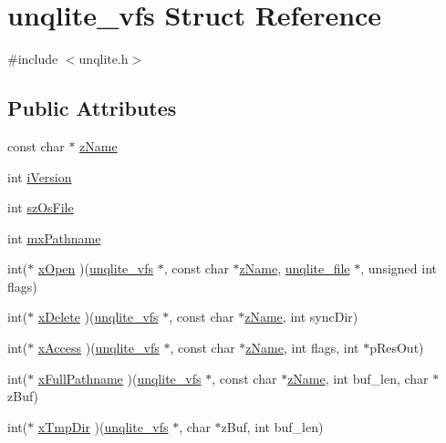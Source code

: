 \hypertarget{structunqlite__vfs}{\section{unqlite\-\_\-vfs Struct Reference}
\label{d5/d07/structunqlite__vfs}
}


{\ttfamily \#include $<$unqlite.\-h$>$}

\subsection*{Public Attributes}
\begin{DoxyCompactItemize}
\item 
const char $\ast$ \hyperlink{structunqlite__vfs_a6408d31a9666612a52fd8248fcc09c15}{z\-Name}
\item 
int \hyperlink{structunqlite__vfs_afd249993dc763d713902629c67118a1a}{i\-Version}
\item 
int \hyperlink{structunqlite__vfs_a7a0d077540d8ea96372383b4b288dca2}{sz\-Os\-File}
\item 
int \hyperlink{structunqlite__vfs_a06f5a5213f2a885826351ba8a8e653b8}{mx\-Pathname}
\item 
int($\ast$ \hyperlink{structunqlite__vfs_a89535ece5182f32a6281d5895cce61a9}{x\-Open} )(\hyperlink{structunqlite__vfs}{unqlite\-\_\-vfs} $\ast$, const char $\ast$\hyperlink{structunqlite__vfs_a6408d31a9666612a52fd8248fcc09c15}{z\-Name}, \hyperlink{structunqlite__file}{unqlite\-\_\-file} $\ast$, unsigned int flags)
\item 
int($\ast$ \hyperlink{structunqlite__vfs_ad961a2b6210572b31877922d4b18eb99}{x\-Delete} )(\hyperlink{structunqlite__vfs}{unqlite\-\_\-vfs} $\ast$, const char $\ast$\hyperlink{structunqlite__vfs_a6408d31a9666612a52fd8248fcc09c15}{z\-Name}, int sync\-Dir)
\item 
int($\ast$ \hyperlink{structunqlite__vfs_a3d8d2a74a38438995cbf4591aa18cad7}{x\-Access} )(\hyperlink{structunqlite__vfs}{unqlite\-\_\-vfs} $\ast$, const char $\ast$\hyperlink{structunqlite__vfs_a6408d31a9666612a52fd8248fcc09c15}{z\-Name}, int flags, int $\ast$p\-Res\-Out)
\item 
int($\ast$ \hyperlink{structunqlite__vfs_ad18e48a2b14c153ff1e06a3194c963b7}{x\-Full\-Pathname} )(\hyperlink{structunqlite__vfs}{unqlite\-\_\-vfs} $\ast$, const char $\ast$\hyperlink{structunqlite__vfs_a6408d31a9666612a52fd8248fcc09c15}{z\-Name}, int buf\-\_\-len, char $\ast$z\-Buf)
\item 
int($\ast$ \hyperlink{structunqlite__vfs_ad525dc6f3ca0b990fbccabdc5588ebcf}{x\-Tmp\-Dir} )(\hyperlink{structunqlite__vfs}{unqlite\-\_\-vfs} $\ast$, char $\ast$z\-Buf, int buf\-\_\-len)

\end{DoxyCompactItemize}

